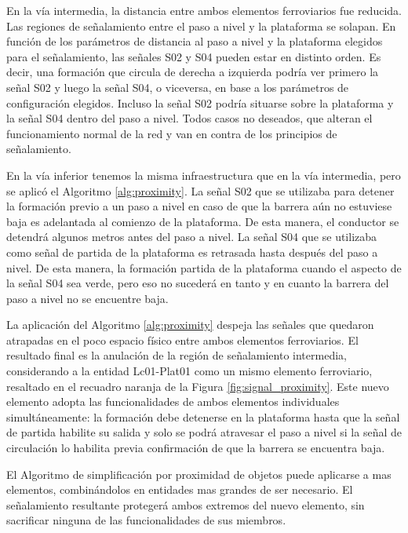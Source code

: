     En la vía intermedia, la distancia entre ambos elementos ferroviarios fue reducida. Las regiones de señalamiento entre el paso a nivel y la plataforma se solapan. En función de los parámetros de distancia al paso a nivel y la plataforma elegidos para el señalamiento, las señales S02 y S04 pueden estar en distinto orden. Es decir, una formación que circula de derecha a izquierda podría ver primero la señal S02 y luego la señal S04, o viceversa, en base a los parámetros de configuración elegidos. Incluso la señal S02 podría situarse sobre la plataforma y la señal S04 dentro del paso a nivel. Todos casos no deseados, que alteran el funcionamiento normal de la red y van en contra de los principios de señalamiento.

    En la vía inferior tenemos la misma infraestructura que en la vía intermedia, pero se aplicó el Algoritmo \ref{alg:proximity}. La señal S02 que se utilizaba para detener la formación previo a un paso a nivel en caso de que la barrera aún no estuviese baja es adelantada al comienzo de la plataforma. De esta manera, el conductor se detendrá algunos metros antes del paso a nivel. La señal S04 que se utilizaba como señal de partida de la plataforma es retrasada hasta después del paso a nivel. De esta manera, la formación partida de la plataforma cuando el aspecto de la señal S04 sea verde, pero eso no sucederá en tanto y en cuanto la barrera del paso a nivel no se encuentre baja.

    La aplicación del Algoritmo \ref{alg:proximity} despeja las señales que quedaron atrapadas en el poco espacio físico entre ambos elementos ferroviarios. El resultado final es la anulación de la región de señalamiento intermedia, considerando a la entidad Lc01-Plat01 como un mismo elemento ferroviario, resaltado en el recuadro naranja de la Figura \ref{fig:signal_proximity}. Este nuevo elemento adopta las funcionalidades de ambos elementos individuales simultáneamente: la formación debe detenerse en la plataforma hasta que la señal de partida habilite su salida y solo se podrá atravesar el paso a nivel si la señal de circulación lo habilita previa confirmación de que la barrera se encuentra baja.

    El Algoritmo de simplificación por proximidad de objetos puede aplicarse a mas elementos, combinándolos en entidades mas grandes de ser necesario. El señalamiento resultante protegerá ambos extremos del nuevo elemento, sin sacrificar ninguna de las funcionalidades de sus miembros.